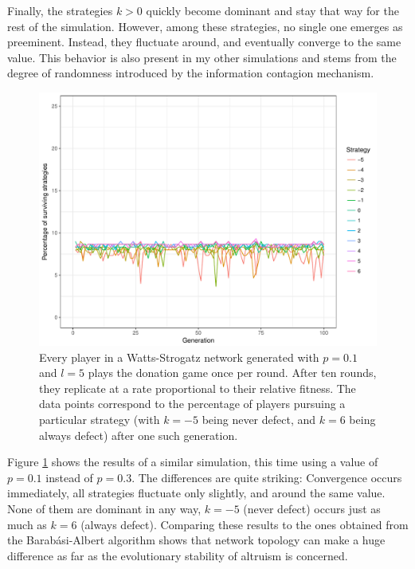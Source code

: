 \documentclass[12pt]{article}
\begin{document}
Finally, the strategies $k>0$ quickly become dominant and stay that way for the rest of the simulation. However, among these strategies, no single one emerges as preeminent. Instead, they fluctuate around, and eventually converge to the same value. This behavior is also present in my other simulations and stems from the degree of randomness introduced by the information contagion mechanism.

\begin{figure}
    \centering
    \includegraphics[width=\linewidth]{../figures/results_WS_300_default.pdf}
    \caption{Every player in a Watts-Strogatz network generated with $p=0.1$ and $l=5$ plays the donation game once per round. After ten rounds, they replicate at a rate proportional to their relative fitness. The data points correspond to the percentage of players pursuing a particular strategy (with $k=-5$ being never defect, and $k=6$ being always defect) after one such generation.}
    \label{WS_300_default}
\end{figure}

Figure \ref{WS_300_default} shows the results of a similar simulation, this time using a value of $p=0.1$ instead of $p=0.3$. The differences are quite striking: Convergence occurs immediately, all strategies fluctuate only slightly, and around the same value. None of them are dominant in any way, $k=-5$ (never defect) occurs just as much as $k=6$ (always defect). Comparing these results to the ones obtained from the Barab\'{a}si-Albert algorithm shows that network topology can make a huge difference as far as the evolutionary stability of altruism is concerned.
\end{document}
